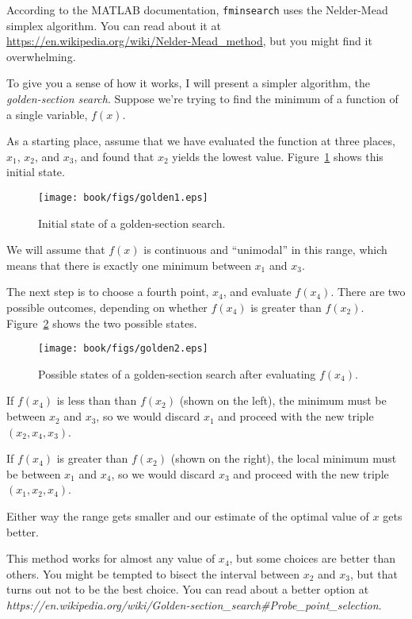 According to the MATLAB documentation, {\tt fminsearch} uses the Nelder-Mead simplex algorithm.  You can read about it at \url{https://en.wikipedia.org/wiki/Nelder-Mead\_method}, but you might find it overwhelming.


To give you a sense of how it works, I will present a simpler algorithm, the \emph{golden-section search}.  Suppose we're trying to find the minimum of a function of a single variable, $f(x)$.  

As a starting place, assume that we have evaluated the function at three places, 
$x_1$, $x_2$, and $x_3$, and found that $x_2$ yields the lowest
value. Figure~\ref{fig:golden1} shows this initial state.

\begin{figure}[ht]
\centerline{\texttt{[image: book/figs/golden1.eps]}}
\caption{Initial state of a golden-section search.}
\label{fig:golden1}
\end{figure}

We will assume that $f(x)$ is continuous and ``unimodal'' in this range, which means that there is exactly one minimum between $x_1$ and $x_3$.


The next step is to choose a fourth point, $x_4$, and evaluate
$f(x_4)$.  There are two possible outcomes, depending on whether
$f(x_4)$ is greater than $f(x_2)$.
Figure~\ref{fig:golden2} shows the two possible states.

\begin{figure}[ht]
\centerline{\texttt{[image: book/figs/golden2.eps]}}
\caption{Possible states of a golden-section search after evaluating $f(x_4)$.}
\label{fig:golden2}
\end{figure}

If $f(x_4)$ is less than than $f(x_2)$ (shown on the left), the
minimum must be between $x_2$ and $x_3$, so we would discard $x_1$ and proceed with the new triple $(x_2, x_4, x_3)$.

If $f(x_4)$ is greater than $f(x_2)$ (shown on the right), the
local minimum must be between $x_1$ and $x_4$, so we would discard $x_3$ and proceed with the new triple $(x_1, x_2, x_4)$.

Either way the range gets smaller and our estimate of the optimal value of $x$ gets better.

This method works for almost any value of $x_4$, but some choices
are better than others.  You might be tempted to bisect the interval between $x_2$ and $x_3$, but that turns out not to be the best choice.  You can read about a better option at \emph{https://en.wikipedia.org/wiki/Golden-section\_search\#Probe\_point\_selection}.
